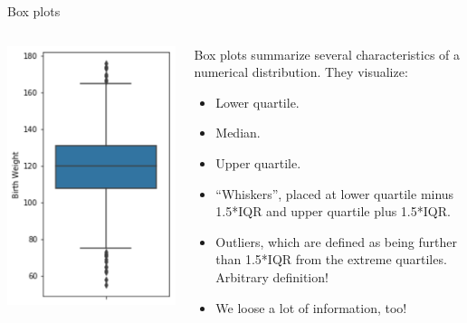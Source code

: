 \documentclass[aspectratio=169]{../latex_main/tntbeamer}  %
\begin{document}
	
	\begin{frame}{Box plots}
	     \begin{columns}
            \begin{column}{.5\textwidth}
            
                       \includegraphics[scale=.5]{Bild38}

            \end{column}
            
            
            \begin{column}{.5\textwidth}
                Box plots summarize several characteristics of a numerical distribution. They visualize:
                \begin{itemize}
                    \item Lower quartile.
                    \item Median.
                    \item Upper quartile.
                    \item “Whiskers”, placed at lower quartile minus 1.5*IQR and upper quartile plus 1.5*IQR.
                    \item Outliers, which are defined as being further than 1.5*IQR from the extreme quartiles. \alert{Arbitrary definition!}
                    \item We loose a lot of information, too!
                \end{itemize}
                
            \end{column}
        \end{columns}
	\end{frame}
	
\end{document}
